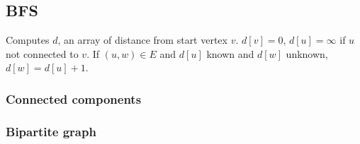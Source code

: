 \subsection{BFS}
Computes $d$, an array of distance from start vertex $v$.
$d[v]=0$, $d[u]=\infty$ if $u$ not connected to $v$. If $(u, w)\in E$ and $d[u]$ known and $d[w]$ unknown, $d[w] = d[u]+1$.\\

\subsubsection{Connected components}

\subsubsection{Bipartite graph}
